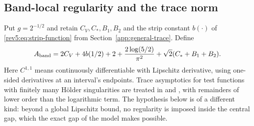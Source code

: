 \subsection{Band-local regularity and the trace norm}
\label{v7:sec:regularity}

Put $g=2^{-1/2}$ and retain $C_V,C_*,B_1,B_2$ and the strip constant
$b(\cdot)$ of \eqref{rev5:eq:strip-function} from
Section~\ref{app:general-trace}.  Define
\[
 A_{\rm band}=2C_V+4b(1/2)+2+\frac{2\log(5/2)}{\pi^2}
                 +\sqrt2(C_*+B_1+B_2).
\]
Here $C^{1,1}$ means continuously differentiable with Lipschitz derivative,
using one-sided derivatives at an interval's endpoints.
Trace asymptotics for test functions with finitely many H\"older
singularities are treated in \cite{LeschkeSobolevSpitzer2017,Sobolev2017}
and \cite[Theorem~4.22]{BollmannMueller2024}, with remainders of lower
order than the logarithmic term.  The hypothesis below is of a different
kind: beyond a global Lipschitz bound, no regularity is imposed inside the
central gap, which the exact gap of the model makes possible.

